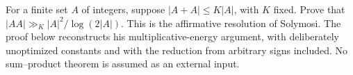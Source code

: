 For a finite set $A$ of integers, suppose $|A+A|\le K|A|$, with $K$ fixed. Prove that $|AA|\gg_K |A|^2/\log(2|A|)$. This is the affirmative resolution of Solymosi. The proof below reconstructs his multiplicative-energy argument, with deliberately unoptimized constants and with the reduction from arbitrary signs included. No sum--product theorem is assumed as an external input.
